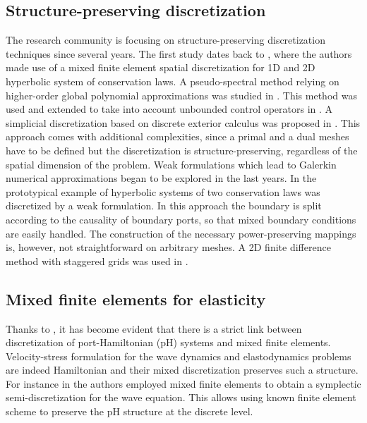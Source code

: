 \subsection{Structure-preserving discretization}

The research community is focusing on structure-preserving discretization techniques since several years. The first study dates back to \cite{golo2004hamiltonian}, where the authors made use of a mixed finite element spatial discretization for 1D and 2D hyperbolic system of conservation laws. A pseudo-spectral method relying on higher-order global polynomial approximations was studied in \cite{moulla2012pseudo}. This method was used and extended to take into account unbounded control operators in \cite{cardoso2017}. A simplicial discretization based on discrete exterior calculus was proposed in \cite{seslija2012discrete}. This approach comes with additional complexities, since a primal and a dual meshes have to be defined but the discretization is structure-preserving, regardless of the spatial dimension of the problem. Weak formulations which lead to Galerkin numerical approximations began to be explored in the last years. In \cite{kotyczka2018weak} the prototypical example of hyperbolic systems of two conservation laws was discretized by a weak formulation. In this approach the boundary is split according to the causality of boundary ports, so that mixed boundary conditions are easily handled. The construction of the necessary power-preserving mappings is, however, not straightforward on arbitrary meshes. A 2D finite difference method with staggered grids was used in \cite{trenchant2018}.

\subsection{Mixed finite elements for elasticity}

Thanks to \cite{cardoso2018pfem}, it has become evident that there is a strict link between  discretization of port-Hamiltonian (pH) systems and mixed finite elements. Velocity-stress formulation for the wave dynamics and elastodynamics problems are indeed Hamiltonian and their mixed discretization preserves such a structure. For instance in \cite{kirby2015} the authors employed mixed finite elements to obtain a  symplectic semi-discretization for the wave equation. This allows using known finite element scheme to preserve the pH structure at the discrete level. \\

